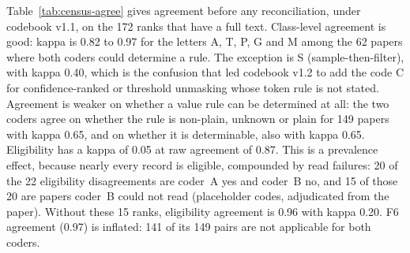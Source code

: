 \documentclass[acmsmall,screen]{acmart}
\begin{document}
Table~\ref{tab:census-agree} gives agreement before any reconciliation, under codebook v1.1, on the 172 ranks that have a full text. %
Class-level agreement is good: kappa is 0.82 to 0.97 for the letters A, T, P, G and M among the 62 papers where both coders could determine a rule. The exception is S (sample-then-filter), with kappa 0.40, which is the confusion that led codebook v1.2 to add the code C for confidence-ranked or threshold unmasking whose token rule is not stated. %
Agreement is weaker on whether a value rule can be determined at all: the two coders agree on whether the rule is non-plain, unknown or plain for 149 papers with kappa 0.65, and on whether it is determinable, also with kappa 0.65. %
Eligibility has a kappa of 0.05 at raw agreement of 0.87. This is a prevalence effect, because nearly every record is eligible, compounded by read failures: 20 of the 22 eligibility disagreements are coder~A yes and coder~B no, and 15 of those 20 are papers coder~B could not read (placeholder codes, adjudicated from the paper). Without these 15 ranks, eligibility agreement is 0.96 with kappa 0.20. %
F6 agreement (0.97) is inflated: 141 of its 149 pairs are not applicable for both coders. %
\end{document}
